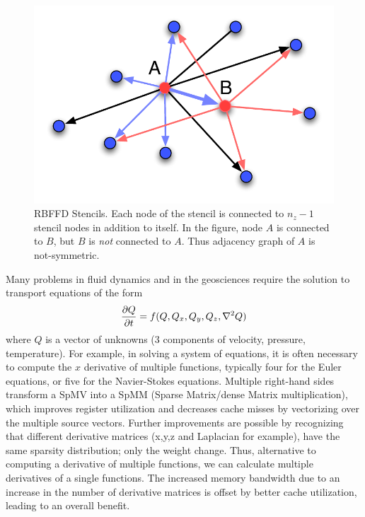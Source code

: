 \documentclass[10pt,conference,compsocconf]{IEEEtran}
\begin{document}
\begin{figure}[tbh]
  \centering
  \includegraphics[width=\linewidth]{figures/rbf_stencils.pdf}
  \caption{RBFFD Stencils. Each node of the stencil is connected to
    $n_z-1$ stencil nodes in addition to itself. In the figure, node
    $A$ is connected to $B$, but $B$ is {\em not\/} connected to
    $A$. Thus adjacency graph of $A$ is not-symmetric.}
  \label{fig:rbf_stencils}
\end{figure}

Many problems in fluid dynamics and in the geosciences require the
solution to transport equations of the form
$$
{\frac{\partial{Q}}{\partial{t}}} = f(Q,Q_x, Q_y, Q_z, \nabla^2 Q)
$$
where $Q$ is a vector of unknowns (3 components of velocity, pressure,
temperature). For example, in solving a system of equations, it is
often necessary to compute the $x$ derivative of multiple functions,
typically four for the Euler equations, or five for the Navier-Stokes
equations. Multiple right-hand sides transform a SpMV into a SpMM
(Sparse Matrix/dense Matrix multiplication), which improves register
utilization and decreases cache misses by vectorizing over the
multiple source vectors. Further improvements are possible by
recognizing that different derivative matrices (x,y,z and Laplacian
for example), have the same sparsity distribution; only the weight
change.  Thus, alternative to computing a derivative of multiple
functions, we can calculate multiple derivatives of a single
functions. The increased memory bandwidth due to an increase in the
number of derivative matrices is offset by better cache utilization,
leading to an overall benefit.

\end{document}
